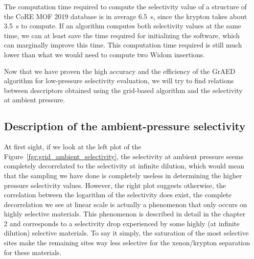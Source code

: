 \documentclass[main]{subfiles}
\begin{document}
The computation time required to compute the selectivity value of a structure of the CoRE MOF 2019 database is in average \SI{6.5}{\second}, since the krypton takes about \SI{3.5}{\second} to compute. If an algorithm computes both selectivity values at the same time, we can at least save the time required for initializing the software, which can marginally improve this time. This computation time required is still much lower than what we would need to compute two Widom insertions.

Now that we have proven the high accuracy and the efficiency of the GrAED algorithm for low-pressure selectivity evaluation, we will try to find relations between descriptors obtained using the grid-based algorithm and the selectivity at ambient pressure.

\subsection{Description of the ambient-pressure selectivity}

At first sight, if we look at the left plot of the Figure~\ref{fgr:grid_ambient_selectivity}, the selectivity at ambient pressure seems completely decorrelated to the selectivity at infinite dilution, which would mean that the sampling we have done is completely useless in determining the higher pressure selectivity values. However, the right plot suggests otherwise, the correlation between the logarithm of the selectivity does exist, the complete decorrelation we see at linear scale is actually a phenomenon that only occurs on highly selective materials. This phenomenon is described in detail in the chapter 2 and corresponds to a selectivity drop experienced by some highly (at infinite dilution) selective materials. To say it simply, the saturation of the most selective sites make the remaining sites way less selective for the xenon/krypton separation for these materials.
\end{document}
